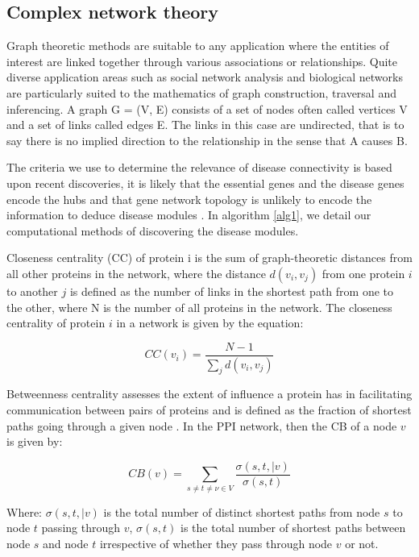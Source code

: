 \documentclass[a4paper,8pt,twocolumn,5p]{elsarticle}
\begin{document}
\subsection{Complex network theory}
Graph theoretic methods are suitable to any application where the entities of interest are linked together through various associations or relationships.  Quite diverse application areas such as social network analysis and biological networks are particularly suited to the mathematics of graph construction, traversal and inferencing. A graph G = (V, E) consists of a set of nodes often called vertices V and a set of links called edges E. The links in this case are undirected, that is to say there is no implied direction to the relationship in the sense that A causes B.

The criteria we use to determine the relevance of disease connectivity is based upon recent discoveries,   it is likely that the essential genes and the disease genes encode the hubs \cite{Vidal2011} and that gene network topology is unlikely to encode the information to deduce disease modules \cite{Ghiassian2015}. In algorithm \ref{alg1}, we detail our computational  methods of discovering the disease modules.

Closeness centrality (CC) of protein i is the sum of graph-theoretic distances from all other proteins in the network, where the distance $d(v_i, v_j)$ from one protein $i$ to another $j$ is defined as the number of links in the shortest path from one to the other, where N is the number of all proteins in the network. The closeness centrality of protein $i$ in a network is given by the equation:

\begin{equation}\label{closeness}
     CC(v_i) =  \frac{N - 1}{\sum_{j} d(v_i,v_j)}
\end{equation}


Betweenness centrality assesses the extent of influence a protein has in facilitating communication between pairs of proteins and is defined as the fraction of shortest paths going through a given node \cite{Freeman1979}. In the PPI network, then the CB of a node $v$ is given by: 

\begin{equation}\label{betweenness}
     CB (v) =  \sum_{s \not= t \not= \nu \in V} \frac{\sigma (s,t, | v)}{\sigma (s,t)}
\end{equation}

Where: $\sigma (s, t, | v)$ is the total number of distinct shortest paths from node $s$ to node $t$ passing through $v$, $\sigma (s,t)$ is the total number of shortest paths between node $s$ and node $t$  irrespective of whether they pass through node $v$ or not. 
\end{document}
